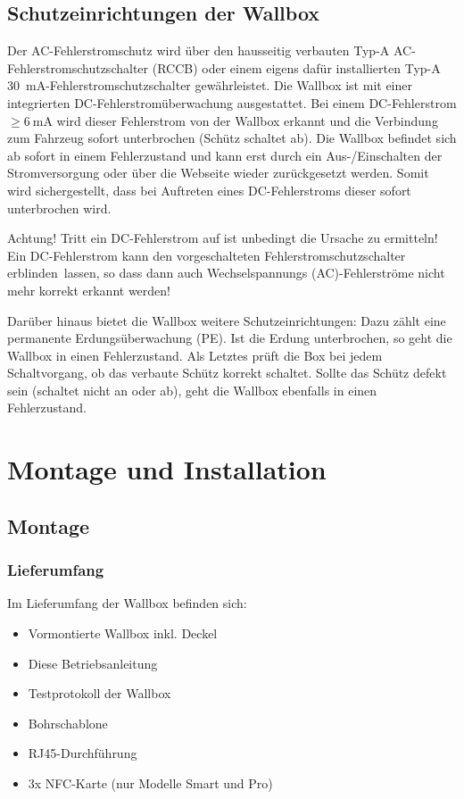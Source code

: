 \documentclass[a4paper,10pt]{article}
\newcommand{\hint}[1]{\begin{tcolorbox}[colback=boxgray,colframe=black,coltext=
white,title=Hinweis]#1\end{tcolorbox}}
\begin{document}
\begin{multicols*}{2}
	\subsection{Schutzeinrichtungen der Wallbox}
	Der AC-Fehlerstromschutz wird über den hausseitig verbauten
	Typ-A AC-Fehlerstromschutzschalter (RCCB) oder einem eigens dafür installierten
	Typ-A \SI{30}{\milli\ampere}-Fehlerstromschutzschalter gewährleistet. Die Wallbox ist
	mit einer integrierten DC-Fehlerstromüberwachung ausgestattet. 
	Bei einem DC-Fehlerstrom $\geq \SI{6}{\milli\ampere}$ wird dieser
	Fehlerstrom von der Wallbox erkannt und die Verbindung zum Fahrzeug sofort
	unterbrochen (Schütz schaltet ab). Die Wallbox befindet sich ab sofort in einem
	Fehlerzustand und kann erst durch ein Aus-/Einschalten der
	Stromversorgung oder über die Webseite wieder zurückgesetzt werden. 
	Somit wird sichergestellt, dass bei Auftreten eines
	DC-Fehlerstroms dieser sofort unterbrochen wird.
	\hint{Achtung! Tritt ein DC-Fehlerstrom auf ist unbedingt die Ursache zu
	ermitteln! Ein DC-Fehlerstrom kann den vorgeschalteten Fehlerstromschutzschalter
	\glqq erblinden\grqq~lassen, so dass dann auch Wechselspannungs
	(AC)-Fehlerströme nicht mehr korrekt erkannt werden!}

	Darüber hinaus bietet die Wallbox weitere Schutzeinrichtungen: Dazu zählt eine
	permanente Erdungsüberwachung (PE). Ist die Erdung unterbrochen, so geht die
	Wallbox in einen Fehlerzustand. Als Letztes prüft die Box bei jedem
	Schaltvorgang, ob das verbaute Schütz korrekt schaltet. Sollte das
	Schütz defekt sein (schaltet nicht an oder ab), geht die Wallbox
	ebenfalls in einen Fehlerzustand.

	\newpage
	\section{Montage und Installation}
	\subsection{Montage}
	\subsubsection{Lieferumfang}
	Im Lieferumfang der Wallbox befinden sich:
	\begin{itemize}
		\item Vormontierte Wallbox inkl. Deckel
		\item Diese Betriebsanleitung
		\item Testprotokoll der Wallbox
		\item Bohrschablone
		\item RJ45-Durchführung
		\item 3x NFC-Karte (nur Modelle Smart und Pro)
	\end{itemize}


\end{multicols*}
\end{document}
